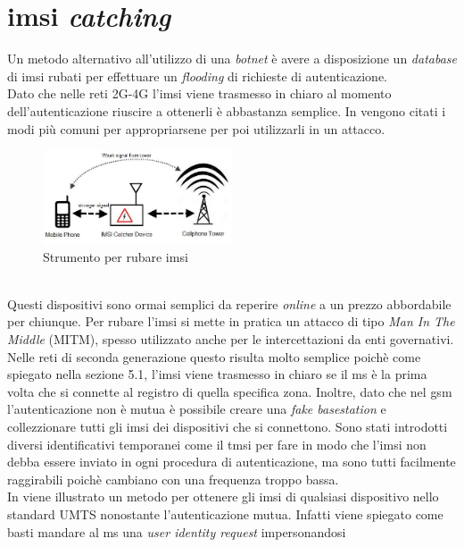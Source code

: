 \section{\gls{imsi} \textit{catching}}
Un metodo alternativo all'utilizzo di una \textit{botnet} è avere a disposizione un \textit{database} di \gls{imsi} rubati per effettuare un \textit{flooding} di richieste di autenticazione.\\
Dato che nelle reti 2G-4G l'\gls{imsi} viene trasmesso in chiaro al momento dell'autenticazione riuscire a ottenerli è abbastanza semplice.
In \cite{imsi-catcher} vengono citati i modi più comuni per appropriarsene per poi utilizzarli in un 
attacco.
\begin{figure}[h]
    \centering
    \includegraphics[width=0.5\textwidth]{images/imsi-catcher.jpg}
    \caption{Strumento per rubare \gls{imsi}}
\end{figure}\\
Questi dispositivi sono ormai semplici da reperire \textit{online} a un prezzo abbordabile per chiunque. Per rubare l'\gls{imsi} si mette in pratica un attacco di tipo \textit{Man In The Middle} (MITM), spesso utilizzato
anche per le intercettazioni da enti governativi.\\
Nelle reti di seconda generazione questo risulta molto semplice poichè come spiegato nella sezione 5.1, l'\gls{imsi} viene trasmesso in chiaro se il \gls{ms} è la prima volta che si connette al registro di quella specifica
zona. Inoltre, dato che nel \gls{gsm} l'autenticazione non è mutua è possibile creare una \textit{fake basestation} e collezzionare tutti gli \gls{imsi} dei dispositivi che si connettono.
Sono stati introdotti diversi identificativi temporanei come il \gls{tmsi} per fare in modo che l'\gls{imsi} non debba essere inviato in ogni procedura di autenticazione, ma sono tutti facilmente raggirabili poichè cambiano con una
frequenza troppo bassa.\\
In \cite{dos-imsi} viene illustrato un metodo per ottenere gli \gls{imsi} di qualsiasi dispositivo nello standard UMTS nonostante l'autenticazione mutua. Infatti viene spiegato come basti mandare al \gls{ms} una \textit{user identity request} impersonandosi 
